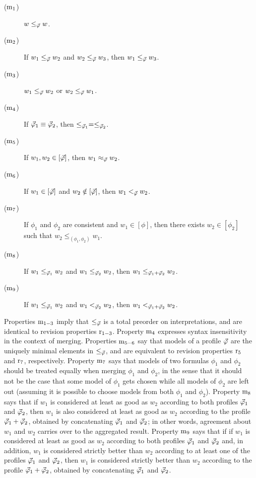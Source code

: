 \begin{description}
	\item[($\oom{1}$)] $w\le_\P w$.
	\item[($\oom{2}$)] If $w_1\le_\P w_2$ and $w_2\le_\P w_3$, then $w_1\le_\P w_3$.
	\item[($\oom{3}$)] $w_1\le_\P w_2$ or $w_2\le_\P w_1$.
	\item[($\oom{4}$)] If $\P_1\equiv\P_2$, then $\le_{\P_1} = \le_{\P_2}$.		
	\item[($\oom{5}$)] If $w_1,w_2\in[\P]$, then $w_1\approx_\P w_2$.
	\item[($\oom{6}$)] If $w_1\in [\P]$ and $w_2\notin [\P]$, then $w_1 <_{\P} w_2$.
	\item[($\oom{7}$)] If $\phi_1$ and $\phi_2$ are consistent and $w_1\in[\phi]$,
		then there exists $w_2\in[\phi_2]$ such that $w_2\le_{(\phi_1,\phi_2)}w_1$. 
	\item[($\oom{8}$)] If $w_1\le_{\P_1} w_2$ and $w_1\le_{\P_2} w_2$, 
		then $w_1\le_{\append{\P_1}{\P_2}} w_2$.
	\item[($\oom{9}$)] If $w_1\le_{\P_1} w_2$ and $w_1<_{\P_2} w_2$, 
		then $w_1<_{\append{\P_1}{\P_2}} w_2$.
\end{description}

Properties $\oom{1-3}$ imply that $\le_{\P}$ is a total preorder on interpretations,
and are identical to revision properties $\oor{1-3}$.
Property $\oom{4}$ expresses syntax insensitivity in the context of merging.
Properties $\oom{5-6}$ say that models of a profile $\P$ are the 
uniquely minimal elements in $\le_{\P}$, 
and are equivalent to revision properties $\oor{5}$ and $\oor{7}$, respectively.
Property $\oom{7}$ says that models of two formulas $\phi_{1}$ and $\phi_{2}$
should be treated equally when merging $\phi_{1}$ and $\phi_{2}$,
in the sense that it should not be the case that some model of $\phi_{1}$
gets chosen while all models of $\phi_{2}$ are left out 
(assuming it is possible to choose models from both $\phi_{1}$ and $\phi_{2}$).
Property $\oom{8}$ says that if $w_{1}$ is considered at least as good as $w_{2}$
according to both profiles $\P_{1}$ and $\P_{2}$, then 
$w_{1}$ is also considered at least as good as $w_{2}$ according to the 
profile $\P_{1}+ \P_{2}$, obtained by concatenating $\P_{1}$ and $\P_{2}$;
in other words, agreement about $w_{1}$ and $w_{2}$ carries over to the 
aggregated result.
Property $\oom{9}$ says that if 
if $w_{1}$ is considered at least as good as $w_{2}$
according to both profiles $\P_{1}$ and $\P_{2}$
and, in addition, 
$w_{1}$ is considered strictly better than $w_{2}$
according to at least one of the profiles $\P_{1}$ and $\P_{2}$,
then $w_{1}$ is considered strictly better than $w_{2}$
according to the 
profile $\P_{1}+ \P_{2}$, obtained by concatenating $\P_{1}$ and $\P_{2}$.

